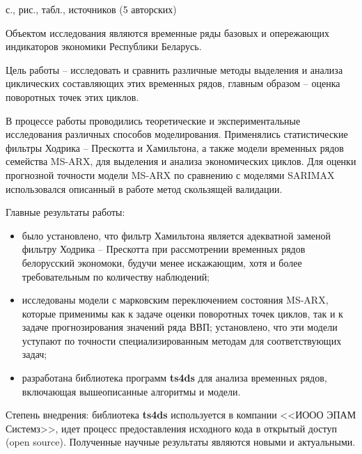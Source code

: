 \documentclass[a4paper,14pt]{extreport}
\begin{document}
	\maketitle
	

	\clearpage
	
	\bsureferat
	{
		\cntpages с., \cntimages рис., \cnttables табл., 
		\cntsources источников (5 авторских)
	}
	{
		Объектом исследования являются временные ряды базовых и опережающих индикаторов экономики Республики Беларусь.
		
		Цель работы -- исследовать и сравнить различные методы выделения и анализа циклических составляющих этих временных рядов, главным образом -- оценка поворотных точек этих циклов.
		
		В процессе работы проводились теоретические и экспериментальные исследования различных способов моделирования. Применялись статистические фильтры Ходрика -- Прескотта и Хамильтона, а также модели временных рядов семейства MS-ARX, для выделения и анализа экономических циклов. Для оценки прогнозной точности модели MS-ARX по сравнению с моделями SARIMAX использовался описанный в работе метод скользящей валидации.
		
		Главные результаты работы: 
		
		\begin{itemize}
			\item было установлено, что фильтр Хамильтона является адекватной заменой фильтру Ходрика -- Прескотта при рассмотрении временных рядов белорусский экономоки, будучи менее искажающим, хотя и более требовательным по количеству наблюдений;
			
			\item исследованы модели с марковским переключением состояния MS-ARX, которые применимы как к задаче оценки поворотных точек циклов, так и к задаче прогнозирования значений ряда ВВП; установлено, что эти модели уступают по точности специализированным методам для соответствующих задач;
			
			\item разработана библиотека программ \textbf{ts4ds} для анализа временных рядов, включающая вышеописанные алгоритмы и модели.
		\end{itemize}
		
		Степень внедрения: библиотека \textbf{ts4ds} используется в компании <<ИООО ЭПАМ Системз>>, идет процесс предоставления исходного кода в открытый доступ (open source).
		Полученные научные результаты являются новыми и актуальными.
		
		
	}
	
\end{document}
